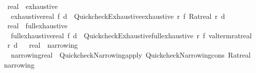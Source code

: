 \begin{isabellebody}
%
\endisatagproof
{\isafoldproof}%
%
\isadelimproof
%
\endisadelimproof
\isanewline
\isanewline
{}\isamarkupfalse%
\isanewline
\isanewline
{}\isamarkupfalse%
\isanewline
\isanewline
{}\isamarkupfalse%
\ real\ {\isacharcolon}{\kern0pt}{\isacharcolon}{\kern0pt}\ exhaustive\isanewline
{}\isanewline
\isanewline
{}\isamarkupfalse%
\isanewline
\ \ {\isachardoublequoteopen}exhaustive{\isacharunderscore}{\kern0pt}real\ f\ d\ {\isacharequal}{\kern0pt}\ Quickcheck{\isacharunderscore}{\kern0pt}Exhaustive{\isachardot}{\kern0pt}exhaustive\ {\isacharparenleft}{\kern0pt}{\isasymlambda}r{\isachardot}{\kern0pt}\ f\ {\isacharparenleft}{\kern0pt}Ratreal\ r{\isacharparenright}{\kern0pt}{\isacharparenright}{\kern0pt}\ d{\isachardoublequoteclose}\isanewline
\isanewline
{}\isamarkupfalse%
%
\isadelimproof
\ %
\endisadelimproof
%
\isatagproof
\isacommand{{\isachardot}{\kern0pt}{\isachardot}{\kern0pt}}\isamarkupfalse%
%
\endisatagproof
{\isafoldproof}%
%
\isadelimproof
%
\endisadelimproof
\isanewline
\isanewline
{}\isamarkupfalse%
\isanewline
\isanewline
{}\isamarkupfalse%
\ real\ {\isacharcolon}{\kern0pt}{\isacharcolon}{\kern0pt}\ full{\isacharunderscore}{\kern0pt}exhaustive\isanewline
{}\isanewline
\isanewline
{}\isamarkupfalse%
\isanewline
\ \ {\isachardoublequoteopen}full{\isacharunderscore}{\kern0pt}exhaustive{\isacharunderscore}{\kern0pt}real\ f\ d\ {\isacharequal}{\kern0pt}\ Quickcheck{\isacharunderscore}{\kern0pt}Exhaustive{\isachardot}{\kern0pt}full{\isacharunderscore}{\kern0pt}exhaustive\ {\isacharparenleft}{\kern0pt}{\isasymlambda}r{\isachardot}{\kern0pt}\ f\ {\isacharparenleft}{\kern0pt}valterm{\isacharunderscore}{\kern0pt}ratreal\ r{\isacharparenright}{\kern0pt}{\isacharparenright}{\kern0pt}\ d{\isachardoublequoteclose}\isanewline
\isanewline
{}\isamarkupfalse%
%
\isadelimproof
\ %
\endisadelimproof
%
\isatagproof
\isacommand{{\isachardot}{\kern0pt}{\isachardot}{\kern0pt}}\isamarkupfalse%
%
\endisatagproof
{\isafoldproof}%
%
\isadelimproof
%
\endisadelimproof
\isanewline
\isanewline
{}\isamarkupfalse%
\isanewline
\isanewline
{}\isamarkupfalse%
\ real\ {\isacharcolon}{\kern0pt}{\isacharcolon}{\kern0pt}\ narrowing\isanewline
{}\isanewline
\isanewline
{}\isamarkupfalse%
\isanewline
\ \ {\isachardoublequoteopen}narrowing{\isacharunderscore}{\kern0pt}real\ {\isacharequal}{\kern0pt}\ Quickcheck{\isacharunderscore}{\kern0pt}Narrowing{\isachardot}{\kern0pt}apply\ {\isacharparenleft}{\kern0pt}Quickcheck{\isacharunderscore}{\kern0pt}Narrowing{\isachardot}{\kern0pt}cons\ Ratreal{\isacharparenright}{\kern0pt}\ narrowing{\isachardoublequoteclose}\isanewline

\end{isabellebody}
